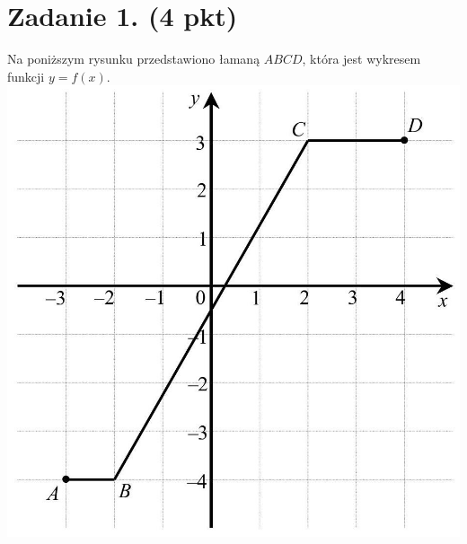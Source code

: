 \documentclass[10pt]{article}
\begin{document}
\section*{Zadanie 1. (4 pkt)}
Na poniższym rysunku przedstawiono łamaną \(A B C D\), która jest wykresem funkcji \(y=f(x)\).\\
\includegraphics[max width=\textwidth, center]{2024_11_21_2f72fc0c2faed8928619g-02}
\end{document}
